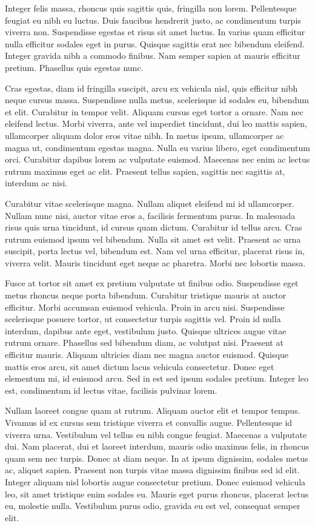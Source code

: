 \documentclass{article}
\begin{document}
Integer felis massa, rhoncus quis sagittis quis, fringilla non lorem.
Pellentesque feugiat eu nibh eu luctus. Duis faucibus hendrerit justo,
ac condimentum turpis viverra non. Suspendisse egestas et risus sit amet
luctus. In varius quam efficitur nulla efficitur sodales eget in purus.
Quisque sagittis erat nec bibendum eleifend. Integer gravida nibh a
commodo finibus. Nam semper sapien at mauris efficitur pretium.
Phasellus quis egestas nunc.

Cras egestas, diam id fringilla suscipit, arcu ex vehicula nisl, quis
efficitur nibh neque cursus massa. Suspendisse nulla metus, scelerisque
id sodales eu, bibendum et elit. Curabitur in tempor velit. Aliquam
cursus eget tortor a ornare. Nam nec eleifend lectus. Morbi viverra,
ante vel imperdiet tincidunt, dui leo mattis sapien, ullamcorper aliquam
dolor eros vitae nibh. In metus ipsum, ullamcorper ac magna ut,
condimentum egestas magna. Nulla eu varius libero, eget condimentum
orci. Curabitur dapibus lorem ac vulputate euismod. Maecenas nec enim ac
lectus rutrum maximus eget ac elit. Praesent tellus sapien, sagittis nec
sagittis at, interdum ac nisi.

Curabitur vitae scelerisque magna. Nullam aliquet eleifend mi id
ullamcorper. Nullam nunc nisi, auctor vitae eros a, facilisis fermentum
purus. In malesuada risus quis urna tincidunt, id cursus quam dictum.
Curabitur id tellus arcu. Cras rutrum euismod ipsum vel bibendum. Nulla
sit amet est velit. Praesent ac urna suscipit, porta lectus vel,
bibendum est. Nam vel urna efficitur, placerat risus in, viverra velit.
Mauris tincidunt eget neque ac pharetra. Morbi nec lobortis massa.

Fusce at tortor sit amet ex pretium vulputate ut finibus odio.
Suspendisse eget metus rhoncus neque porta bibendum. Curabitur tristique
mauris at auctor efficitur. Morbi accumsan euismod vehicula. Proin in
arcu nisi. Suspendisse scelerisque posuere tortor, ut consectetur turpis
sagittis vel. Proin id nulla interdum, dapibus ante eget, vestibulum
justo. Quisque ultrices augue vitae rutrum ornare. Phasellus sed
bibendum diam, ac volutpat nisi. Praesent at efficitur mauris. Aliquam
ultricies diam nec magna auctor euismod. Quisque mattis eros arcu, sit
amet dictum lacus vehicula consectetur. Donec eget elementum mi, id
euismod arcu. Sed in est sed ipsum sodales pretium. Integer leo est,
condimentum id lectus vitae, facilisis pulvinar lorem.

Nullam laoreet congue quam at rutrum. Aliquam auctor elit et tempor
tempus. Vivamus id ex cursus sem tristique viverra et convallis augue.
Pellentesque id viverra urna. Vestibulum vel tellus eu nibh congue
feugiat. Maecenas a vulputate dui. Nam placerat, dui et laoreet
interdum, mauris odio maximus felis, in rhoncus quam sem nec turpis.
Donec at diam neque. In at ipsum dignissim, sodales metus ac, aliquet
sapien. Praesent non turpis vitae massa dignissim finibus sed id elit.
Integer aliquam nisl lobortis augue consectetur pretium. Donec euismod
vehicula leo, sit amet tristique enim sodales eu. Mauris eget purus
rhoncus, placerat lectus eu, molestie nulla. Vestibulum purus odio,
gravida eu est vel, consequat semper elit.
\end{document}
